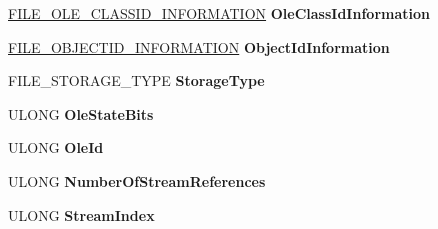 \begin{DoxyCompactItemize}
\item 
\mbox{\label{struct___f_i_l_e___o_l_e___a_l_l___i_n_f_o_r_m_a_t_i_o_n_af3764499f589da2cb3cd04924c66a3ba}} 
\hyperlink{struct___f_i_l_e___o_l_e___c_l_a_s_s_i_d___i_n_f_o_r_m_a_t_i_o_n}{F\+I\+L\+E\+\_\+\+O\+L\+E\+\_\+\+C\+L\+A\+S\+S\+I\+D\+\_\+\+I\+N\+F\+O\+R\+M\+A\+T\+I\+ON} {\bfseries Ole\+Class\+Id\+Information}
\item 
\mbox{\label{struct___f_i_l_e___o_l_e___a_l_l___i_n_f_o_r_m_a_t_i_o_n_aebee73077c2bb6ebd904b3f76b054f29}} 
\hyperlink{struct___f_i_l_e___o_b_j_e_c_t_i_d___i_n_f_o_r_m_a_t_i_o_n}{F\+I\+L\+E\+\_\+\+O\+B\+J\+E\+C\+T\+I\+D\+\_\+\+I\+N\+F\+O\+R\+M\+A\+T\+I\+ON} {\bfseries Object\+Id\+Information}
\item 
\mbox{\label{struct___f_i_l_e___o_l_e___a_l_l___i_n_f_o_r_m_a_t_i_o_n_aa8e872507b9fcfbb18a66c43b303abcd}} 
F\+I\+L\+E\+\_\+\+S\+T\+O\+R\+A\+G\+E\+\_\+\+T\+Y\+PE {\bfseries Storage\+Type}
\item 
\mbox{\label{struct___f_i_l_e___o_l_e___a_l_l___i_n_f_o_r_m_a_t_i_o_n_a7666ede67b953ab849d6a46b3b623737}} 
U\+L\+O\+NG {\bfseries Ole\+State\+Bits}
\item 
\mbox{\label{struct___f_i_l_e___o_l_e___a_l_l___i_n_f_o_r_m_a_t_i_o_n_a0d7aa8db1b3266d52848ff9a59ab232e}} 
U\+L\+O\+NG {\bfseries Ole\+Id}
\item 
\mbox{\label{struct___f_i_l_e___o_l_e___a_l_l___i_n_f_o_r_m_a_t_i_o_n_a82e536ba3fdb4bf1592aa176c9e13bca}} 
U\+L\+O\+NG {\bfseries Number\+Of\+Stream\+References}
\item 
\mbox{\label{struct___f_i_l_e___o_l_e___a_l_l___i_n_f_o_r_m_a_t_i_o_n_aed84fcb7cc49d5898c8bd147c18f25b3}} 
U\+L\+O\+NG {\bfseries Stream\+Index}
\item 
\mbox{\label{struct___f_i_l_e___o_l_e___a_l_l___i_n_f_o_r_m_a_t_i_o_n_aeed20cbc68dc8ab0e155ad34980949a1}} 

\end{DoxyCompactItemize}

